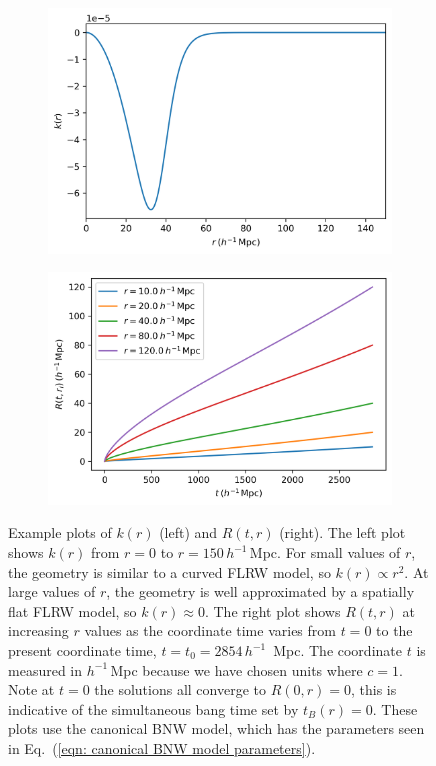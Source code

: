 \documentclass[a4paper,12pt]{report}
\renewcommand{\eqref}[1]{Eq.~({#1})}
\begin{document}
\begin{figure}[ht]
     \centering
     \begin{subfigure}[b]{0.45\textwidth}
         \centering
         \includegraphics[width=\textwidth]{BNW params k_plot.png}
     \end{subfigure}
     \begin{subfigure}[b]{0.45\textwidth}
         \centering
         \includegraphics[width=\textwidth]{BNW params R_plot.png}
     \end{subfigure}
      \caption{Example plots of $k(r)$ (left) and $R(t,r)$ (right). The left plot shows $k(r)$ from $r=0$ to $r=150\, h^{-1}\,$Mpc. For small values of $r$, the geometry is similar to a curved FLRW model, so $k(r) \propto r^2$. At large values of $r$, the geometry is well approximated by a spatially flat FLRW model, so $k(r) \approx 0$. The right plot shows $R(t,r)$ at increasing $r$ values as the coordinate time varies from $t=0$ to the present coordinate time, $t=t_0=2854\, h^{-1}\,$ Mpc. The coordinate $t$ is measured in $h^{-1}\,$Mpc because we have chosen units where $c=1$. Note at $t=0$ the solutions all converge to $R(0,r)=0$, this is indicative of the simultaneous bang time set by $t_B(r)=0$. These plots use the canonical BNW model, which has the parameters seen in \eqref{\ref{eqn: canonical BNW model parameters}}.}
      \label{fig: BNW dynamics example plots}
\end{figure}
\end{document}
